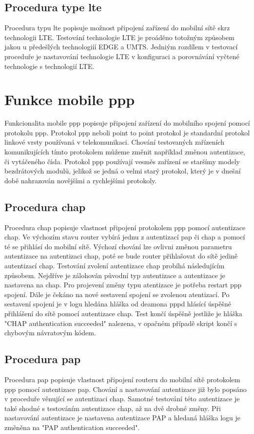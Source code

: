 \subsection{Procedura type lte}
Procedura typu lte popisuje možnost připojení zařízení do mobilní sítě skrz technologii LTE. Testování technologie LTE je proáděno totožným způsobem jakou u předešlých technologiíí EDGE a UMTS. Jedniým rozdílem v testovací proceduře je nastavování technologie LTE v konfiguraci a porovnávání vyčtené technologie s technologií LTE.

\section{Funkce mobile ppp}
Funkcionalita mobile ppp popisuje připojení zařízení do mobilního spojení pomocí protokolu ppp. Protokol ppp neboli point to point protokol je standardní protokol linkové vrsty používaná v telekomunikaci. Chování testovaných zařízeních komunikujících tímto protokolem můžeme změnit například změnou autentizace, či vytáčeného čísla. Protokol ppp používají vesměs zařízení se staršímy modely bezdrátových modulů, jelikož se jedná o velmi starý protokol, který je v dnešní době nahrazován novějšími a rychlejšími protokoly.

\subsection{Procedura chap}
Procedura chap popisuje vlastnost připojení protokolem ppp pomocí autentizace chap. Ve výchozím stavu router vybírá jednu z autentizací pap či chap a pomocí té se přihlásí do mobilní sítě. Výchozí chování lze ovlivni změnou parametru autentizace na autentizaci chap, poté se bude router přihlašovat do sítě jedině autentizací chap. Testování zvolení autentizace chap probíhá následujícím způsobem. Nejdříve je zálohován původní typ autentizace a autentizace je nastavena na chap. Pro projevení změny typu atentizace je potřeba restart ppp spojení. Dále je čekáno na nové sestavení spojení se zvolenou atentizací. Po sestavení spojení je v logu hledána hláška od deamona pppd hlásící úspěšné přihlášení do sítě pomocí autentizace chap. Test končí úspěšně jestliže je hláška "CHAP authentication succeeded" nalezena, v opačném případě skript končí s chybovým návratovým kódem.

\subsection{Procedura pap}
Procedura pap popisuje vlastnost připojení routeru do mobilní sítě protokolem ppp pomocí autentizace pap. Chování a nastavování autentizace již bylo popsáno v proceduře věnující se autentizaci chap. Samotné testování této autentizace je také shodné s testováním autentizace chap, až na dvě drobné změny. Při nastavování autentizace je nastavena autentizace PAP a hledaná hláška logu je změněna na "PAP authentication succeeded".

